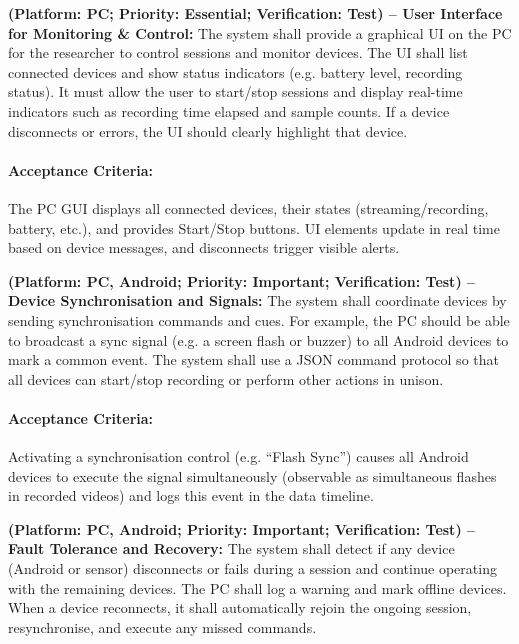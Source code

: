 \begin{description}[style=unboxed,leftmargin=0cm]
    \item[\textbf{FR6}] \textbf{(Platform: PC; Priority: Essential; Verification: Test) – User Interface for Monitoring \& Control:} The system shall provide a graphical UI on the PC for the researcher to control sessions and monitor devices. The UI shall list connected devices and show status indicators (e.g. battery level, recording status). It must allow the user to start/stop sessions and display real-time indicators such as recording time elapsed and sample counts. If a device disconnects or errors, the UI should clearly highlight that device.

    \paragraph{Acceptance Criteria:} The PC GUI displays all connected devices, their states (streaming/recording, battery, etc.), and provides Start/Stop buttons. UI elements update in real time based on device messages, and disconnects trigger visible alerts.

    \item[\textbf{FR7}] \textbf{(Platform: PC, Android; Priority: Important; Verification: Test) – Device Synchronisation and Signals:} The system shall coordinate devices by sending synchronisation commands and cues. For example, the PC should be able to broadcast a sync signal (e.g. a screen flash or buzzer) to all Android devices to mark a common event. The system shall use a JSON command protocol so that all devices can start/stop recording or perform other actions in unison.

    \paragraph{Acceptance Criteria:} Activating a synchronisation control (e.g. “Flash Sync”) causes all Android devices to execute the signal simultaneously (observable as simultaneous flashes in recorded videos) and logs this event in the data timeline.

    \item[\textbf{FR8}] \textbf{(Platform: PC, Android; Priority: Important; Verification: Test) – Fault Tolerance and Recovery:} The system shall detect if any device (Android or sensor) disconnects or fails during a session and continue operating with the remaining devices. The PC shall log a warning and mark offline devices. When a device reconnects, it shall automatically rejoin the ongoing session, resynchronise, and execute any missed commands.


\end{description}
